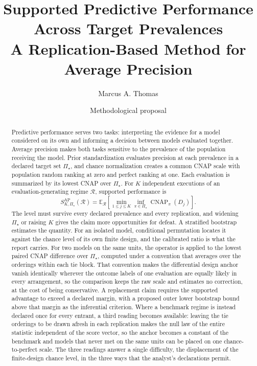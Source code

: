 \documentclass[11pt]{article}
\title{Supported Predictive Performance Across Target Prevalences\\
\large A Replication-Based Method for Average Precision}
\author{Marcus A. Thomas}
\date{Methodological proposal}
\newcommand{\CNAP}{\operatorname{CNAP}}
\newcommand{\Regime}{\mathcal{R}}
\newcommand{\PSet}{\Pi_\star}
\newcommand{\E}{\mathbb{E}}
\theoremstyle{remark}
\begin{document}
\maketitle

\begin{abstract}
Predictive performance serves two tasks: interpreting the evidence for a model considered on its own and informing a decision between models evaluated together. Average precision makes both tasks sensitive to the prevalence of the population receiving the model. Prior standardization evaluates precision at each prevalence in a declared target set $\PSet$, and chance normalization creates a common CNAP scale with population random ranking at zero and perfect ranking at one. Each evaluation is summarized by its lowest CNAP over $\PSet$. For $K$ independent executions of an evaluation-generating regime $\Regime$, supported performance is
\[
S_{K,\PSet}^{\mathrm{AP}}(\Regime)
=
\E_{\Regime}
\left[
\min_{1\leq j\leq K}
\inf_{\pi\in\PSet}\CNAP_\pi(D_j)
\right].
\]
The level must survive every declared prevalence and every replication, and widening $\PSet$ or raising $K$ gives the claim more opportunities for defeat. A stratified bootstrap estimates the quantity. For an isolated model, conditional permutation locates it against the chance level of its own finite design, and the calibrated ratio is what the report carries. For two models on the same units, the operator is applied to the lowest paired CNAP difference over $\PSet$, computed under a convention that averages over the orderings within each tie block. That convention makes the differential design anchor vanish identically wherever the outcome labels of one evaluation are equally likely in every arrangement, so the comparison keeps the raw scale and estimates no correction, at the cost of being conservative. A replacement claim requires the supported advantage to exceed a declared margin, with a proposed outer lower bootstrap bound above that margin as the inferential criterion. Where a benchmark regime is instead declared once for every entrant, a third reading becomes available: leaving the tie orderings to be drawn afresh in each replication makes the null law of the entire statistic independent of the score vector, so the anchor becomes a constant of the benchmark and models that never met on the same units can be placed on one chance-to-perfect scale. The three readings answer a single difficulty, the displacement of the finite-design chance level, in the three ways that the analyst's declarations permit.
\end{abstract}
\end{document}
